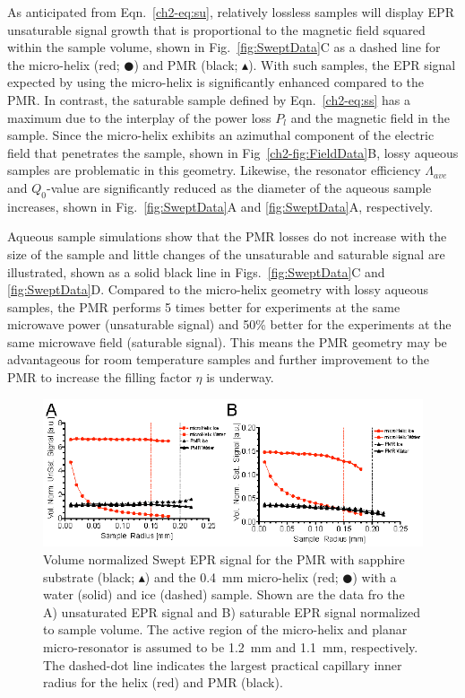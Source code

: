 As anticipated from Eqn.~\ref{ch2-eq:su}, relatively lossless samples will display EPR unsaturable signal growth that is proportional to the magnetic field squared within the sample volume, shown in Fig.~\ref{fig:SweptData}C as a dashed line for the micro-helix (red; $\CIRCLE$) and PMR (black; $\blacktriangle$). With such samples, the EPR signal expected by using the micro-helix is significantly enhanced compared to the PMR. In contrast, the saturable sample defined by  Eqn.~\ref{ch2-eq:ss} has a maximum due to the interplay of the power loss $P_l$ and the magnetic field in the sample. Since the micro-helix exhibits an azimuthal component of the electric field that penetrates the sample, shown in Fig~\ref{ch2-fig:FieldData}B, lossy aqueous samples are problematic in this geometry. Likewise, the  resonator efficiency $\Lambda_{ave}$ and $Q_0$-value are significantly reduced as the diameter of the aqueous sample increases, shown in Fig.~\ref{fig:SweptData}A and \ref{fig:SweptData}A, respectively.

Aqueous sample simulations show that the PMR losses do not increase with the size of the sample and little changes of the unsaturable and saturable signal are illustrated, shown as a solid black line in Figs.~\ref{fig:SweptData}C and \ref{fig:SweptData}D. Compared to the micro-helix geometry with lossy aqueous samples, the PMR performs 5 times better for experiments at the same microwave power (unsaturable signal) and 50\% better for the experiments at the same microwave field (saturable signal). This means the PMR geometry may be advantageous for room temperature samples and further improvement to the PMR to increase the filling factor $\eta$ is underway. 

\begin{figure}[htb]
 \centering
 \includegraphics[width=\textwidth]{Kapitel/Ch2-Images/Ch2-AbsSweepOutput.eps}
 \caption[Volume normalized swept EPR signal optimization.]{Volume normalized Swept EPR signal for the PMR with sapphire substrate (black; $\blacktriangle$) and the 0.4~mm micro-helix (red; $\CIRCLE$) with a water (solid) and ice (dashed) sample. Shown are the data fro the A) unsaturated EPR signal and B) saturable EPR signal normalized to sample volume. The active region of the micro-helix and planar micro-resonator is assumed to be 1.2~mm and 1.1~mm, respectively. The dashed-dot line indicates the largest practical capillary inner radius for the helix (red) and PMR (black).}
 \label{fig:AbsSweptData}
\end{figure}


